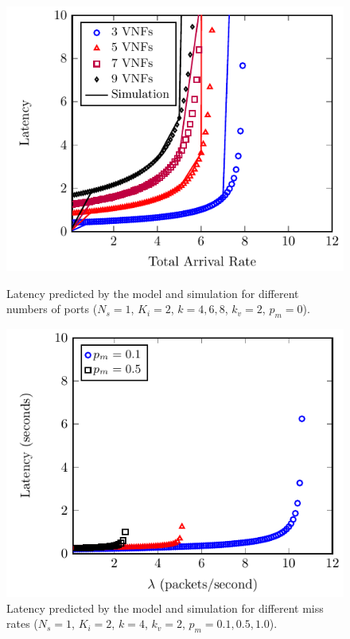 \begin{figure}
	\vspace{2mm}

	\centering
	\begin{minipage}[b]{.49\textwidth}
		\includegraphics[width=\linewidth]{graphs/diff_lengths}
		\caption{Latency predicted by the model and simulation for different numbers
		of ports ($N_s=1$, $K_i=2$, $k={4,6,8}$, $k_v=2$, $p_m=0$).}
		\label{fig:num_ports}
	\end{minipage}
	\hfill
	\begin{minipage}[b]{.49\textwidth}
		\includegraphics[width=\linewidth]{graphs/diff_sdn}
		\caption{Latency predicted by the model and simulation for different miss rates ($N_s=1$, $K_i=2$, $k=4$, $k_v=2$, $p_m={0.1,0.5,1.0}$).}
		\label{fig:sdn_perc}
	\end{minipage}

\end{figure}

